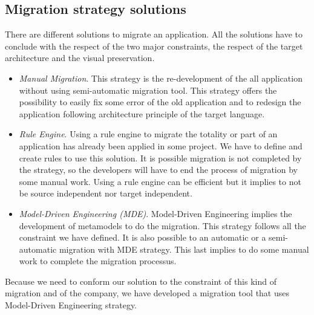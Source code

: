 \documentclass[conference]{IEEEtran}
\begin{document}
    
    \subsection{Migration strategy solutions}
    
    There are different solutions to migrate an application.
    All the solutions have to conclude with the respect of the two major constraints, 
        the respect of the target architecture and the visual preservation.
    
    \begin{itemize}
        
        \item \emph{Manual Migration}. This strategy is the re-development of the all application
            without using semi-automatic migration tool.
        This strategy offers the possibility to easily fix some error of the old application and to 
            redesign the application following architecture principle of the target language. %
    
        \item \emph{Rule Engine}. Using a rule engine to migrate the totality or part of an application has
                already been applied in some project. %
            We have to define and create rules to use this solution.
            It is possible migration is not completed by the strategy, so the developers will have to
                end the process of migration by some manual work.
            Using a rule engine can be efficient but it implies to not be source independent nor target independent.
    
        \item \emph{Model-Driven Engineering (MDE)}. Model-Driven Engineering implies the development of metamodels
            to do the migration.
            This strategy follows all the constraint we have defined.
            It is also possible to an automatic or a semi-automatic migration with MDE strategy.
            This last implies to do some manual work to complete the migration processus.
    
    \end{itemize}
    
    Because we need to conform our solution to the constraint of this kind of migration
        and of the company, we have developed a migration tool that uses Model-Driven Engineering strategy. 
    
\end{document}
